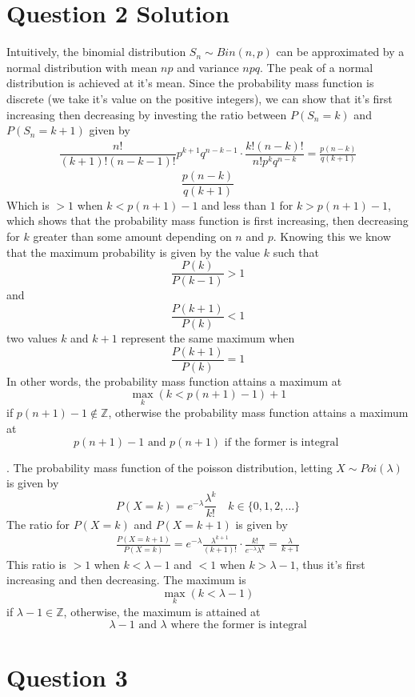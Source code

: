 \documentclass[a4paper,11pt]{article}
\begin{document}
\clearpage

\section{ Question 2 Solution}
Intuitively, the binomial distribution $S_n \sim Bin(n,p)$ can be approximated by a normal distribution with mean $np$ and variance $npq$. The peak of a normal distribution is achieved at it's mean. Since the probability mass function is discrete (we take it's value on the positive integers), we can show that it's first increasing then decreasing by investing the ratio between $P(S_n = k)$ and $P(S_n = k+1)$ given by
\begin{align*}
	\dfrac{n!}{\left( k+1\right) !\left( n-k-1\right) !}p^{k+1}q^{n-k-1} \cdot \dfrac{k!\left( n-k\right) !}{n!p^{k}q^{n-k}} = \frac{p(n-k)}{q(k+1)}
\end{align*}
$$
 \frac{p(n-k)}{q(k+1)}
$$
Which is $> 1$ when $k < p(n+1)-1$ and less than $1$ for $k > p(n+1)-1 $, which shows that the probability mass function is first increasing, then decreasing for $k$ greater than some amount depending on $n$ and $p$. Knowing this we know that the maximum probability is given by the value $k$ such that 
$$\frac{P(k)}{P(k-1)} > 1$$
	and
$$\frac{P(k+1)}{P(k)} < 1$$
two values $k$ and $k+1$ represent the same maximum when 
$$\frac{P(k+1)}{P(k)} = 1$$
In other words, the probability mass function attains a maximum at 
$$ \max_{k}(k < p(n+1)-1) + 1$$ 
if $p(n+1)-1 \notin \mathbb{Z}$, otherwise the probability mass function attains a maximum at 
$$ p(n+1)-1 \text{ and } p(n+1) \text { if the former is integral } $$

. The probability mass function of the poisson distribution, letting $X \sim Poi(\lambda)$ is given by
$$ P(X=k) = e^{-\lambda}\frac{\lambda^k}{k!} \quad k \in \{0,1,2,\ldots\}$$
The ratio for $P(X =k)$ and $P(X = k+1)$ is given by 
\begin{align*}
	\frac{P(X = k+1)}{P(X=k)} = e^{-\lambda}\frac{\lambda^{k+1}}{(k+1)!} \cdot \frac{k!}{e^{-\lambda}\lambda^k} = \frac{\lambda}{k+1}
\end{align*}
This ratio is $>1$ when $ k < \lambda - 1$ and $<1$ when $k > \lambda -1$, thus it's first increasing and then decreasing. The maximum is
$$\max_{k}(k < \lambda - 1)$$
if $\lambda -1 \in \mathbb{Z}$, otherwise, the maximum is attained at 
$$\lambda - 1 \text{ and } \lambda \text{ where the former is integral} $$

\clearpage


\section*{Question 3}
\end{document}
